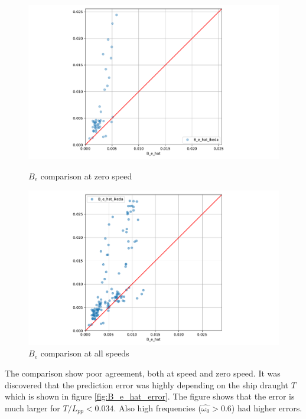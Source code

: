 \begin{figure}[H]
\centering
\begin{minipage}{.5\textwidth}
  \centering
  \includegraphics[width=1.0\columnwidth]{figures/B_e_hat_ikeda_zero.pdf}
  \caption{$\hat{B_e}$ comparison at zero speed}
  \label{fig:B_e_hat_ikeda_zero}
\end{minipage}%
\begin{minipage}{.5\textwidth}
  \centering
  \includegraphics[width=1.0\columnwidth]{figures/B_e_hat_ikeda.pdf}
  \caption{$\hat{B_e}$ comparison at all speeds}
  \label{fig:B_e_hat_ikeda}
\end{minipage}
\end{figure}


The comparison show poor agreement, both at speed and zero speed. It was discovered that the prediction error was highly depending on the ship draught $T$ which is shown in figure  \ref{fig:B_e_hat_error}.
The figure shows that the error is much larger for $T/L_{pp}<0.034$. Also high frequencies ($\hat{\omega_0} > 0.6$) had higher errors.

